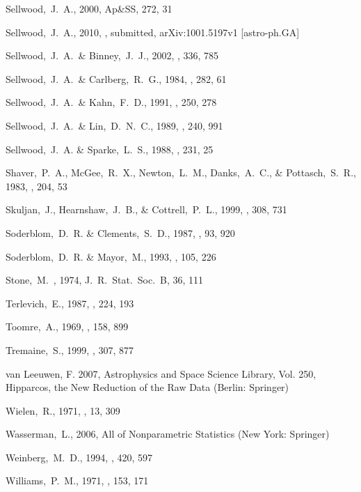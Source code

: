 \begin{thebibliography}{99}
  Sellwood,~J.~A., 2000,
  Ap\&SS, 272, 31

  Sellwood,~J.~A., 2010,
  \mnras, submitted, 
  arXiv:1001.5197v1 [astro-ph.GA] 

  Sellwood,~J.~A.~\& Binney,~J.~J., 2002,
  \mnras, 336, 785

  Sellwood,~J.~A.~\& Carlberg,~R.~G., 1984,
  \apj, 282, 61

  Sellwood,~J.~A.~\& Kahn,~F.~D., 1991,
  \mnras, 250, 278

  Sellwood,~J.~A.~\& Lin,~D.~N.~C., 1989,
  \mnras, 240, 991

  Sellwood,~J.~A. \& Sparke,~L.~S., 1988,
  \mnras, 231, 25

  Shaver,~P.~A., McGee,~R.~X., Newton,~L.~M., Danks,~A.~C., \& Pottasch,~S.~R., 1983,
  \mnras, 204, 53

  Skuljan,~J., Hearnshaw,~J.~B., \& Cottrell,~P.~L., 1999, \mnras, 308, 731

  Soderblom,~D.~R. \& Clements,~S.~D., 1987, \aj, 93, 920

  Soderblom,~D.~R. \& Mayor,~M., 1993,
  \aj, 105, 226

  Stone,~M.~, 1974,
  J.~R.~Stat.~Soc.~B, 36, 111

  Terlevich,~E., 1987,
  \mnras, 224, 193

  Toomre,~A., 1969,
  \apj, 158, 899

  Tremaine,~S., 1999,
  \mnras, 307, 877

 {van Leeuwen}, F. 2007,
Astrophysics and Space Science Library, Vol. 250, {Hipparcos, the New
Reduction of the Raw Data} (Berlin: {Springer})

  Wielen,~R., 1971, \aap, 13, 309

  Wasserman,~L., 2006,
  All of Nonparametric Statistics (New York: Springer)

  Weinberg,~M.~D., 1994,
  \apj, 420, 597

  Williams,~P.~M., 1971, \mnras, 153, 171


\end{thebibliography}
